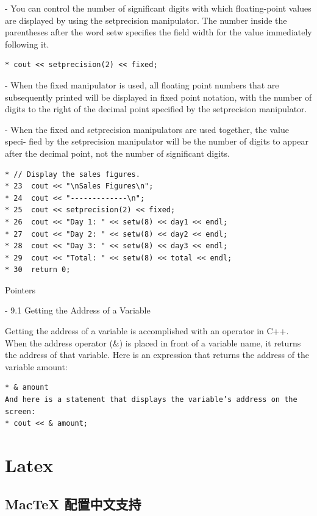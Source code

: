 - You can control the number of significant digits with which floating-point values are displayed by using the setprecision manipulator. 
The number inside the parentheses after the word setw specifies the field width for the value immediately following it. 
\begin{verbatim}
* cout << setprecision(2) << fixed; 
\end{verbatim}

- When the fixed manipulator is used, all floating point numbers that are subsequently printed will be displayed in fixed point notation, with the number of digits to the right of the decimal point specified by the setprecision manipulator. 

- When the fixed and setprecision manipulators are used together, the value speci- fied by the setprecision manipulator will be the number of digits to appear after the decimal point, not the number of significant digits. 

\begin{verbatim}
* // Display the sales figures. 
* 23  cout << "\nSales Figures\n"; 
* 24  cout << "-------------\n"; 
* 25  cout << setprecision(2) << fixed; 
* 26  cout << "Day 1: " << setw(8) << day1 << endl; 
* 27  cout << "Day 2: " << setw(8) << day2 << endl; 
* 28  cout << "Day 3: " << setw(8) << day3 << endl; 
* 29  cout << "Total: " << setw(8) << total << endl; 
* 30  return 0; 

\end{verbatim}

Pointers 


- 9.1 Getting the Address of a Variable

Getting the address of a variable is accomplished with an operator in C++. When the address operator ($\&$) is placed in front of a variable name, it returns the address of that variable. Here is an expression that returns the address of the variable amount: 

\begin{verbatim}
* & amount 
And here is a statement that displays the variable’s address on the screen: 
* cout << & amount; 
\end{verbatim}



\chapter{Latex}

\section{ MacTeX 配置中文支持}

